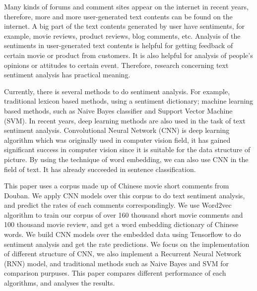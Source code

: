 \begin{enabstract}
Many kinds of forums and comment sites appear on the internet in recent years, therefore, more and more user-generated text contents can be found on the internet. A big part of the text contents generated by user have sentiments, for example, movie reviews, product reviews, blog comments, etc. Analysis of the sentiments in user-generated text contents is helpful for getting feedback of certain movie or product from customers. It is also helpful for analysis of people's opinions or attitudes to certain event. Therefore, research concerning text sentiment analysis has practical meaning.

Currently, there is several methods to do sentiment analysis. For example, traditional lexicon based methods, using a sentiment dictionary; machine learning based methods, such as Naive Bayes classifier and Support Vector Machine (SVM). In recent years, deep learning methods are also used in the task of text sentiment analysis. Convolutional Neural Network (CNN) is deep learning algorithm which was originally used in computer vision field, it has gained significant success in computer vision since it is suitable for the data structure of picture. By using the technique of word embedding, we can also use CNN in the field of text. It has already succeeded in sentence classification.

This paper uses a corpus made up of Chinese movie short comments from Douban. We apply CNN models over this corpus to do text sentiment analysis, and predict the rates of each comments correspondingly. We use Word2vec algorithm to train our corpus of over 160 thousand short movie comments and 100 thousand movie review, and get a word embedding dictionary of Chinese words. We build CNN models over the embedded data using Tensorflow to do sentiment analysis and get the rate predictions. We focus on the implementation of different structure of CNN, we also implement a Recurrent Neural Network (RNN) model, and traditional methods such as Naive Bayes and SVM for comparison purpuses. This paper compares different performance of each algorithms, and analyses the results.

\end{enabstract}

